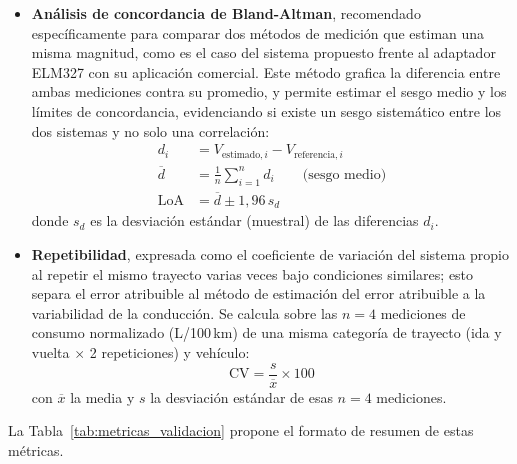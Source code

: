 \begin{itemize}
	\item \textbf{Análisis de concordancia de Bland-Altman}, recomendado específicamente para comparar dos métodos de medición que estiman una misma magnitud, como es el caso del sistema propuesto frente al adaptador ELM327 con su aplicación comercial. Este método grafica la diferencia entre ambas mediciones contra su promedio, y permite estimar el sesgo medio y los límites de concordancia, evidenciando si existe un sesgo sistemático entre los dos sistemas y no solo una correlación:
	\begin{align}
		d_i &= V_{\text{estimado},i} - V_{\text{referencia},i} \label{eq:ba_diferencia}\\
		\overline{d} &= \frac{1}{n}\sum_{i=1}^{n} d_i \qquad \text{(sesgo medio)} \label{eq:ba_sesgo}\\
		\text{LoA} &= \overline{d} \pm 1{,}96\, s_d \label{eq:ba_loa}
	\end{align}
	donde $s_d$ es la desviación estándar (muestral) de las diferencias $d_i$.
	\item \textbf{Repetibilidad}, expresada como el coeficiente de variación del sistema propio al repetir el mismo trayecto varias veces bajo condiciones similares; esto separa el error atribuible al método de estimación del error atribuible a la variabilidad de la conducción. Se calcula sobre las $n=4$ mediciones de consumo normalizado (L/100\,km) de una misma categoría de trayecto (ida y vuelta $\times$ 2 repeticiones) y vehículo:
	\begin{equation}
		\text{CV} = \frac{s}{\overline{x}} \times 100
		\label{eq:cv_repetibilidad}
	\end{equation}
	con $\overline{x}$ la media y $s$ la desviación estándar de esas $n=4$ mediciones.
\end{itemize}

La Tabla~\ref{tab:metricas_validacion} propone el formato de resumen de estas métricas.

